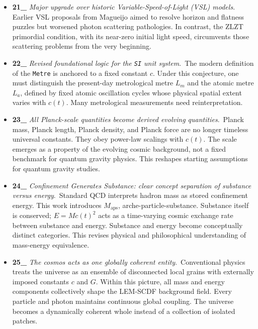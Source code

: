 \documentclass[12pt,leqno]{article}
\begin{document}
{\begin{itemize}
		\item \textbf{21\_} \textit{Major upgrade over historic Variable-Speed-of-Light (VSL) models}.\,\,\,Earlier VSL proposals from Magueijo aimed to resolve horizon and flatness puzzles but worsened photon scattering pathologies. In contrast, the ZLZT primordial condition, with its near-zero initial light speed, circumvents those scattering problems from the very beginning.
		
		\item \textbf{22\_} \textit{Revised foundational logic for the \texttt{SI} unit system}.\,\,\,The modern definition of the  \texttt{Metre} is anchored to a fixed constant $c$. Under this conjecture, one must distinguish the present-day metrological metre $L_m$ and the atomic metre $L_a$, defined by fixed atomic oscillation cycles whose physical spatial extent varies with $c(t)$. Many metrological measurements need reinterpretation. 
		
		\item \textbf{23\_} \textit{All Planck-scale quantities become derived evolving quantities}.\,\,\,Planck mass, Planck length, Planck density, and Planck force are no longer timeless universal constants. They obey power-law scalings with $c(t)$. The scale emerges as a property of the evolving cosmic background, not a fixed benchmark for quantum gravity physics. This reshapes starting assumptions for quantum gravity studies.
		
		\item \textbf{24\_} \textit{Confinement Generates Substance: clear concept separation of substance versus energy}.\,\,\,Standard QCD interprets hadron mass as stored confinement energy. This work introduces $M_\mathrm{aps}$, arche-particle-substance. Substance itself is conserved; $E = M c(t)^2$ acts as a time-varying cosmic exchange rate between substance and energy. Substance and energy become conceptually distinct categories. This revises physical and philosophical understanding of mass-energy equivalence.
		
		\item \textbf{25\_} \textit{The cosmos acts as one globally coherent entity}.\,\,\,Conventional physics treats the universe as an ensemble of disconnected local grains with externally imposed constants $c$ and $G$. Within this picture, all mass and energy components collectively shape the LEM-SCDF background field. Every particle and photon maintains continuous global coupling. The universe becomes a dynamically coherent whole instead of a collection of isolated patches.
	\end{itemize}
	
}
\end{document}
